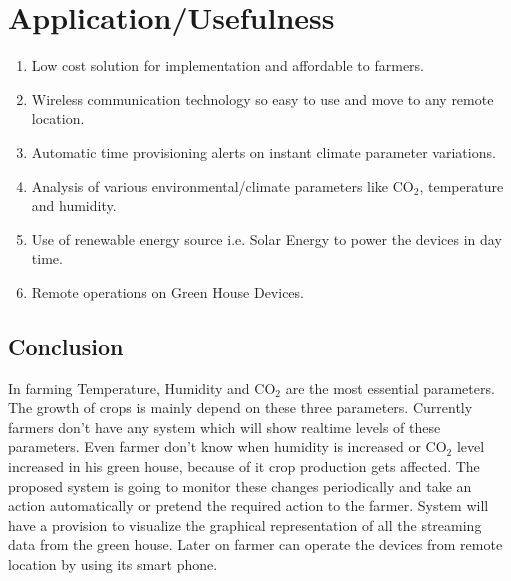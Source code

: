\documentclass[10pt,a4paper]{article}
\begin{document}
\section{Application/Usefulness}
\begin{enumerate}
\item Low cost solution for implementation and affordable to farmers. 
\item Wireless communication technology so easy to use and move to any remote location.
\item Automatic time provisioning alerts on instant climate parameter variations.
\item Analysis of various environmental/climate parameters like CO\ensuremath{_2}, temperature and humidity.
\item Use of renewable energy source i.e. Solar Energy to power the devices in day time.
\item Remote operations on Green House Devices.
\end{enumerate}
\begin{large}
\section{Conclusion}
\end{large}

\quad
In farming Temperature, Humidity and CO\ensuremath{_2} are the most essential parameters. The growth of crops is mainly depend on these three parameters. Currently farmers don't have any system which will show realtime levels of these parameters. Even farmer don't know when humidity is increased or CO\ensuremath{_2} level increased in his green house, because of it crop production gets affected. The proposed system is going to monitor these changes periodically and take an action automatically or pretend the required action to the farmer. System will have a provision to visualize the graphical representation of all the streaming data from the green house. Later on farmer can operate the devices from remote location by using its smart phone.
\end{document}
